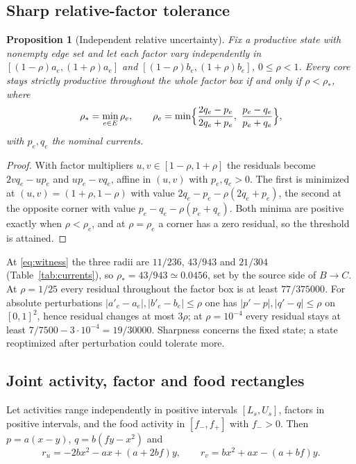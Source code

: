 \documentclass[11pt,a4paper]{article}
\theoremstyle{plain}
\newtheorem{proposition}[theorem]{Proposition}
\theoremstyle{definition}
\theoremstyle{remark}
\begin{document}
\subsection{Sharp relative-factor tolerance}

\begin{proposition}[Independent relative uncertainty]\label{prop:relative}
Fix a productive state with nonempty edge set and let each factor vary independently in $[(1-\rho)a_e,(1+\rho)a_e]$ and $[(1-\rho)b_e,(1+\rho)b_e]$, $0\le\rho<1$. Every core stays strictly productive throughout the whole factor box if and only if $\rho<\rho_*$, where
\begin{equation}\label{eq:radius}
  \rho_*=\min_{e\in E}\rho_e,\qquad \rho_e=\min\Bigl\{\frac{2q_e-p_e}{2q_e+p_e},\ \frac{p_e-q_e}{p_e+q_e}\Bigr\},
\end{equation}
with $p_e,q_e$ the nominal currents.
\end{proposition}

\begin{proof}
With factor multipliers $u,v\in[1-\rho,1+\rho]$ the residuals become $2vq_e-up_e$ and $up_e-vq_e$, affine in $(u,v)$ with $p_e,q_e>0$. The first is minimized at $(u,v)=(1+\rho,1-\rho)$ with value $2q_e-p_e-\rho(2q_e+p_e)$, the second at the opposite corner with value $p_e-q_e-\rho(p_e+q_e)$. Both minima are positive exactly when $\rho<\rho_e$, and at $\rho=\rho_e$ a corner has a zero residual, so the threshold is attained.
\end{proof}

At \eqref{eq:witness} the three radii are $11/236$, $43/943$ and $21/304$ (Table~\ref{tab:currents}), so $\rho_*=43/943\simeq0.0456$, set by the source side of $B\to C$. At $\rho=1/25$ every residual throughout the factor box is at least $77/375000$. For absolute perturbations $|a'_e-a_e|,|b'_e-b_e|\le\rho$ one has $|p'-p|,|q'-q|\le\rho$ on $[0,1]^2$, hence residual changes at most $3\rho$; at $\rho=10^{-4}$ every residual stays at least $7/7500-3\cdot10^{-4}=19/30000$. Sharpness concerns the fixed state; a state reoptimized after perturbation could tolerate more.

\subsection{Joint activity, factor and food rectangles}

Let activities range independently in positive intervals $[L_s,U_s]$, factors in positive intervals, and the food activity in $[f_-,f_+]$ with $f_->0$. Then $p=a(x-y)$, $q=b(fy-x^2)$ and
\begin{equation}\label{eq:foodres}
  r_u=-2bx^2-ax+(a+2bf)y,\qquad r_v=bx^2+ax-(a+bf)y .
\end{equation}
\end{document}
